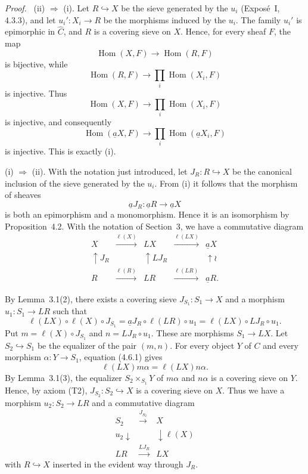 \documentclass[11pt]{article}
\newcommand{\Hom}{\operatorname{Hom}}
\newenvironment{prooftext}{\par\noindent\emph{Proof.}\ }{\par\medskip}
\begin{document}
\begin{prooftext}
(ii) \(\Rightarrow\) (i). Let \(R\hookrightarrow X\) be the sieve generated by the \(u_i\) (Expos\'e~I, 4.3.3), and let \(u_i':X_i\to R\) be the morphisms induced by the \(u_i\). The family \(u_i'\) is epimorphic in \(\widehat C\), and \(R\) is a covering sieve on \(X\). Hence, for every sheaf \(F\), the map
\[
\Hom(X,F)\longrightarrow \Hom(R,F)
\]
is bijective, while
\[
\Hom(R,F)\longrightarrow \prod_i\Hom(X_i,F)
\]
is injective. Thus
\[
\Hom(X,F)\longrightarrow \prod_i\Hom(X_i,F)
\]
is injective, and consequently
\[
\Hom(\underline aX,F)\longrightarrow \prod_i\Hom(\underline aX_i,F)
\]
is injective. This is exactly (i).

(i) \(\Rightarrow\) (ii). With the notation just introduced, let \(J_R:R\hookrightarrow X\) be the canonical inclusion of the sieve generated by the \(u_i\). From (i) it follows that the morphism of sheaves
\[
\underline aJ_R:\underline aR\longrightarrow \underline aX
\]
is both an epimorphism and a monomorphism. Hence it is an isomorphism by Proposition~4.2. With the notation of Section~3, we have a commutative diagram
\[
\begin{array}{ccccc}
X&\xrightarrow{\ell(X)}&LX&\xrightarrow{\ell(LX)}&\underline aX\\
\uparrow J_R&&\uparrow LJ_R&&\uparrow\wr\\
R&\xrightarrow{\ell(R)}&LR&\xrightarrow{\ell(LR)}&\underline aR.
\end{array}
\]

By Lemma~3.1(2), there exists a covering sieve \(J_{S_1}:S_1\to X\) and a morphism \(u_1:S_1\to LR\) such that
\[
\ell(LX)\circ \ell(X)\circ J_{S_1}
=
\underline aJ_R\circ \ell(LR)\circ u_1
=
\ell(LX)\circ LJ_R\circ u_1.
\tag{4.6.1}
\]
Put \(m=\ell(X)\circ J_{S_1}\) and \(n=LJ_R\circ u_1\). These are morphisms \(S_1\to LX\). Let \(S_2\hookrightarrow S_1\) be the equalizer of the pair \((m,n)\). For every object \(Y\) of \(C\) and every morphism \(\alpha:Y\to S_1\), equation (4.6.1) gives
\[
\ell(LX)m\alpha=\ell(LX)n\alpha.
\]
By Lemma~3.1(3), the equalizer \(S_2\times_{S_1}Y\) of \(m\alpha\) and \(n\alpha\) is a covering sieve on \(Y\). Hence, by axiom (T2), \(J_{S_2}:S_2\hookrightarrow X\) is a covering sieve on \(X\). Thus we have a morphism \(u_2:S_2\to LR\) and a commutative diagram
\[
\begin{array}{ccc}
S_2&\xrightarrow{J_{S_2}}&X\\
{\scriptstyle u_2}\downarrow&&\downarrow{\scriptstyle \ell(X)}\\
LR&\xrightarrow{LJ_R}&LX
\end{array}
\tag{4.6.2}
\]
with \(R\hookrightarrow X\) inserted in the evident way through \(J_R\).


\end{prooftext}
\end{document}
